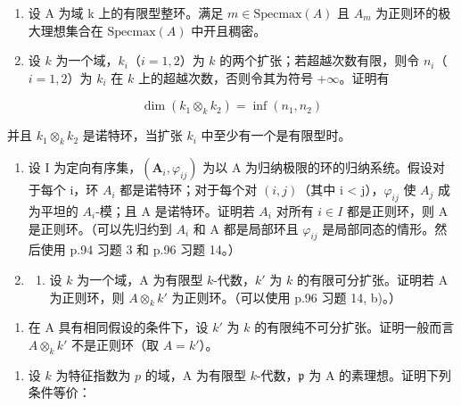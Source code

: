 \begin{enumerate}
\def\labelenumi{\arabic{enumi})}
\setcounter{enumi}{18}
\item
  设 A 为域 k 上的有限型整环。满足 \(m \in \text{Specmax}(A)\) 且 \(A_{m}\) 为正则环的极大理想集合在 \(\text{Specmax}(A)\) 中开且稠密。
\item
  设 \(k\) 为一个域，\(k_{i}\)（\(i = 1, 2\)）为 \(k\) 的两个扩张；若超越次数有限，则令 \(n_{i}\)（\(i = 1, 2\)）为 \(k_{i}\) 在 \(k\) 上的超越次数，否则令其为符号 +\(\infty\)。证明有
\end{enumerate}

\[
\dim (k _ {1} \otimes_ {k} k _ {2}) = \inf (n _ {1}, n _ {2})
\]

并且 \(k_{1} \otimes_{k} k_{2}\) 是诺特环，当扩张 \(k_{i}\) 中至少有一个是有限型时。

\begin{enumerate}
\def\labelenumi{\arabic{enumi})}
\setcounter{enumi}{20}
\item
  设 I 为定向有序集，\((\mathbf{A}_{i}, \varphi_{ij})\) 为以 A 为归纳极限的环的归纳系统。假设对于每个 i，环 \(A_{i}\) 都是诺特环；对于每个对 \((i, j)\)（其中 i \textless{} j），\(\varphi_{ij}\) 使 \(A_{j}\) 成为平坦的 \(A_{i}\)-模；且 A 是诺特环。证明若 \(A_{i}\) 对所有 \(i \in I\) 都是正则环，则 A 是正则环。（可以先归约到 \(A_{i}\) 和 A 都是局部环且 \(\varphi_{ij}\) 是局部同态的情形。然后使用 p.94 习题 3 和 p.96 习题 14。）
\item
  \begin{enumerate}
  \def\labelenumii{\alph{enumii})}
  \tightlist
  \item
    设 \(k\) 为一个域，A 为有限型 \(k\)-代数，\(k'\) 为 \(k\) 的有限可分扩张。证明若 A 为正则环，则 \(A \otimes_k k'\) 为正则环。（可以使用 p.96 习题 14, b)。）
  \end{enumerate}
\end{enumerate}

\begin{enumerate}
\def\labelenumi{\alph{enumi})}
\setcounter{enumi}{1}
\tightlist
\item
  在 A 具有相同假设的条件下，设 \(k'\) 为 \(k\) 的有限纯不可分扩张。证明一般而言 \(A \otimes_k k'\) 不是正则环（取 \(A = k'\)）。
\end{enumerate}

\begin{enumerate}
\def\labelenumi{\arabic{enumi})}
\setcounter{enumi}{22}
\tightlist
\item
  设 \(k\) 为特征指数为 \(p\) 的域，A 为有限型 \(k\)-代数，\(\mathfrak{p}\) 为 A 的素理想。证明下列条件等价：
\end{enumerate}

